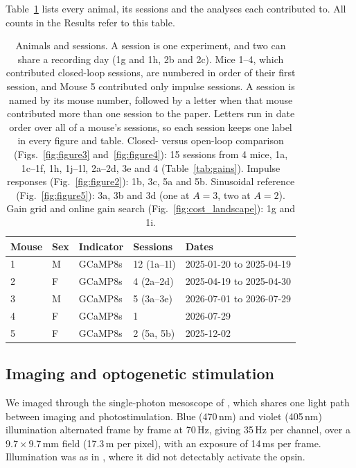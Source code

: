 Table~\ref{tab:cohort} lists every animal, its sessions and the analyses each contributed to.
All counts in the Results refer to this table.

\begin{table}[h]
    \centering
    \small
    \begin{tabular}{lllll}
        \hline
        Mouse & Sex & Indicator & Sessions & Dates \\
        \hline
        1 & M & GCaMP8s & 12 (1a--1l) & 2025-01-20 to 2025-04-19 \\
        2 & F & GCaMP8s & 4 (2a--2d) & 2025-04-19 to 2025-04-30 \\
        3 & M & GCaMP8s & 5 (3a--3e) & 2026-07-01 to 2026-07-29 \\
        4 & F & GCaMP8s & 1 & 2026-07-29 \\
        5 & F & GCaMP8s & 2 (5a, 5b) & 2025-12-02 \\
        \hline
    \end{tabular}
    \caption{Animals and sessions.
        A session is one experiment, and two can share a recording day (1g and 1h, 2b and 2c).
        Mice 1--4, which contributed closed-loop sessions, are numbered in order of their first session, and Mouse 5 contributed only impulse sessions.
        A session is named by its mouse number, followed by a letter when that mouse contributed more than one session to the paper.
        Letters run in date order over all of a mouse's sessions, so each session keeps one label in every figure and table.
        Closed- versus open-loop comparison (Figs.~\ref{fig:figure3} and~\ref{fig:figure4}): 15 sessions from 4 mice, 1a, 1c--1f, 1h, 1j--1l, 2a--2d, 3e and 4 (Table~\ref{tab:gains}).
        Impulse responses (Fig.~\ref{fig:figure2}): 1b, 3c, 5a and 5b.
        Sinusoidal reference (Fig.~\ref{fig:figure5}): 3a, 3b and 3d (one at $A = 3$, two at $A = 2$).
        Gain grid and online gain search (Fig.~\ref{fig:cost_landscape}): 1g and 1i.}
    \label{tab:cohort}
\end{table}

\subsection*{Imaging and optogenetic stimulation}

We imaged through the single-photon mesoscope of \citet{Matveev2024}, which shares one light path between imaging and photostimulation.
Blue (470\,nm) and violet (405\,nm) illumination alternated frame by frame at 70\,Hz, giving 35\,Hz per channel, over a $9.7 \times 9.7$\,mm field (17.3\,\textmu m per pixel), with an exposure of 14\,ms per frame.
Illumination was as in \citet{Matveev2024}, where it did not detectably activate the opsin.

